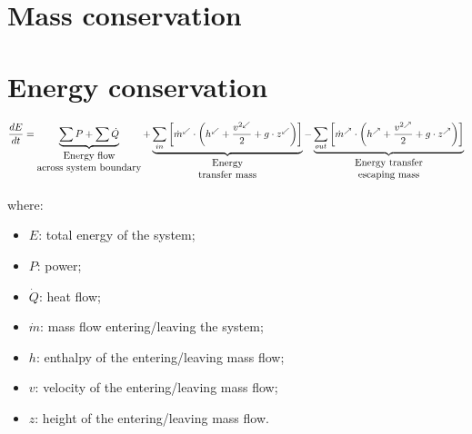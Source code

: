 \documentclass{article}
\begin{document}
\newpage
\section{Mass conservation}


\newpage

\section{Energy conservation}
\[
	\frac{dE}{dt}=
	\underbrace{\sum P + \sum \dot{Q}}_{
		\substack{
			\begin{tabular}{@{}c@{}}
				\text{Energy flow} \\ \text{across system boundary}
			\end{tabular}
		}}
        + \underbrace{\sum_{in} \left[\dot{m}^{\swarrow} \cdot \left(h^{\swarrow} + \frac{v^{2\swarrow}}{2}+g\cdot z^{\swarrow}\right)\right]}_{
			\substack{
				\begin{tabular}{@{}c@{}}
					\text{Energy}\\ \text{transfer mass}
				\end{tabular}}}
		-\underbrace{\sum_{out}\left[\dot{m}^{\nearrow}\cdot \left(h^{\nearrow}+\frac{v^{2\nearrow}}{2}+g\cdot z^{\nearrow}\right)\right]}_{
			\substack{
				\begin{tabular}{@{}c@{}}
					\text{Energy transfer} \\ \text{escaping mass}
				\end{tabular}}} 
\]  

where:

\begin{minipage}{0.45\textwidth}
\begin{itemize}
    \item $E$: total energy of the system;
    \item $P$: power;
    \item $\dot{Q}$: heat flow;
    \item $\dot{m}$: mass flow entering/leaving the system;
\end{itemize}
\end{minipage}
\hfill
\begin{minipage}{0.45\textwidth}
\begin{itemize}
    \item $h$: enthalpy of the entering/leaving mass flow;
    \item $v$: velocity of the entering/leaving mass flow;
    \item $z$: height of the entering/leaving mass flow.
\end{itemize}
\end{minipage}
\end{document}
